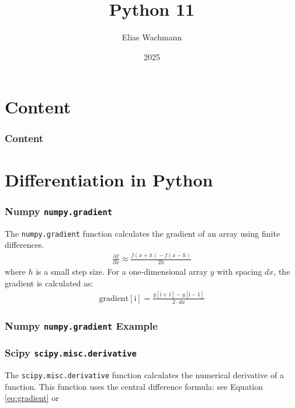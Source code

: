 \documentclass{beamer}
\title[]
{Python 11}
\author[E.~Wachmann]{\scriptsize Elias Wachmann
}
\date{2025} %
\institute[Institute of Theoretical and Computational Physics]
{
}
\begin{document}
\titleframe


\section*{Content}

\begin{frame}
\frametitle{Content}
  \tableofcontents
\end{frame}

\section{Differentiation in Python}
\begin{frame}
    \frametitle{Numpy \texttt{numpy.gradient}}
    The \texttt{numpy.gradient} function calculates the gradient of an array using finite differences.
    \begin{align}
        \label{eq:gradient}
      \frac{\partial f}{\partial x} \approx \frac{f(x + h) - f(x - h)}{2h}
    \end{align}
    where \( h \) is a small step size. For a one-dimensional array \( y \) with spacing \( dx \), the gradient is calculated as:
    \begin{align}
      \text{gradient}[\text{i}] = \frac{y[\text{i}+1] - y[\text{i}-1]}{2 \cdot dx}
    \end{align}
\end{frame}

\begin{frame}
  \frametitle{Numpy \texttt{numpy.gradient} Example}
  
\end{frame}

\begin{frame}
  \frametitle{Scipy \texttt{scipy.misc.derivative}}
  The \texttt{scipy.misc.derivative} function calculates the numerical derivative of a function.
  This function uses the central difference formula:
  see Equation \ref{eq:gradient} or 
  
\end{frame}
\end{document}
